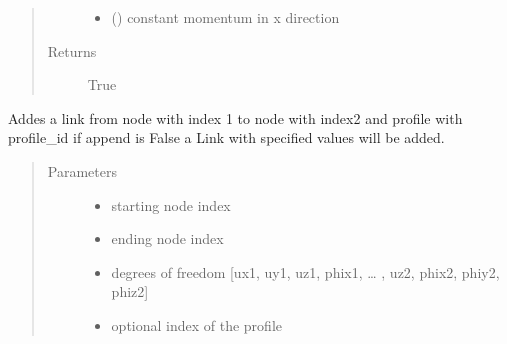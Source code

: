 \documentclass[letterpaper,10pt,english]{sphinxmanual}
\begin{document}
\begin{fulllineitems}
\begin{fulllineitems}
\begin{quote}
\begin{description}
\begin{itemize}
\item {} 
 () \textendash{} constant momentum in x direction

\end{itemize}

\item[{Returns}] \leavevmode
True

\end{description}\end{quote}

\end{fulllineitems}


\begin{fulllineitems}
\label{\detokenize{api:beamon.database.Database.add_link}}
Addes a link from node with index 1 to node with index2 and profile with profile\_id
if append is False a Link with specified values will be added.
\begin{quote}\begin{description}
\item[{Parameters}] \leavevmode\begin{itemize}
\item {} 
 \textendash{} starting node index

\item {} 
 \textendash{} ending node index

\item {} 
 \textendash{} degrees of freedom {[}ux1, uy1, uz1, phix1, … , uz2, phix2, phiy2, phiz2{]}

\item {} 
 \textendash{} optional index of the profile


\end{itemize}
\end{description}
\end{quote}
\end{fulllineitems}
\end{fulllineitems}
\end{document}
